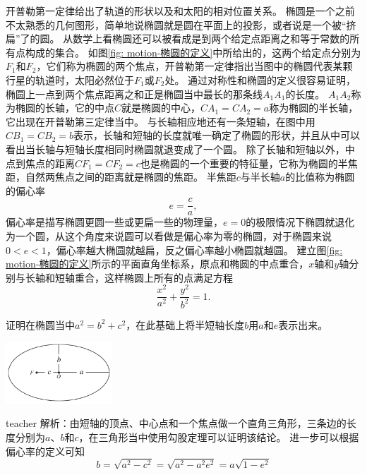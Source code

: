 开普勒第一定律给出了轨道的形状以及和太阳的相对位置关系。
椭圆是一个之前不太熟悉的几何图形，简单地说椭圆就是圆在平面上的投影，或者说是一个被“挤扁”了的圆。
从数学上看椭圆还可以被看成是到两个给定点距离之和等于常数的所有点构成的集合。
如图\ref{fig: motion-椭圆的定义}中所给出的，这两个给定点分别为$F_1$和$F_2$，它们称为椭圆的两个{\heiti 焦点}，开普勒第一定律指出当图中的椭圆代表某颗行星的轨道时，太阳必然位于$F_1$或$F_2$处。
通过对称性和椭圆的定义很容易证明，椭圆上一点到两个焦点距离之和正是椭圆当中最长的那条线$A_1A_1$的长度。
$A_1A_2$称为椭圆的{\heiti 长轴}，它的中点$C$就是椭圆的中心，$CA_1=CA_2=a$称为椭圆的半长轴，它出现在开普勒第三定律当中。
与长轴相应地还有一条短轴，在图中用$CB_1=CB_2=b$表示，长轴和短轴的长度就唯一确定了椭圆的形状，并且从中可以看出当长轴与短轴长度相同时椭圆就退变成了一个圆。
除了长轴和短轴以外，中点到焦点的距离$CF_1=CF_2=c$也是椭圆的一个重要的特征量，它称为椭圆的{\heiti 半焦距}，自然两焦点之间的距离就是椭圆的{\heiti 焦距}。
半焦距$c$与半长轴$a$的比值称为椭圆的偏心率
\begin{equation}
e = \frac{c}{a},
\end{equation}
偏心率是描写椭圆更圆一些或更扁一些的物理量，$e=0$的极限情况下椭圆就退化为一个圆，从这个角度来说圆可以看做是偏心率为零的椭圆，对于椭圆来说$0<e<1$，偏心率越大椭圆就越扁，反之偏心率越小椭圆就越圆。
建立图\ref{fig: motion-椭圆的定义}所示的平面直角坐标系，原点和椭圆的中点重合，$x$轴和$y$轴分别与长轴和短轴重合，这样椭圆上所有的点满足方程
\begin{equation}
\frac{x^2}{a^2}+\frac{y^2}{b^2}=1.
\end{equation}




\begin{example}
证明在椭圆当中$a^2=b^2+c^2$，在此基础上将半短轴长度$b$用$a$和$e$表示出来。
\begin{flushright}
\includegraphics[width = 0.3\textwidth]{images/motion-37.pdf} 
\end{flushright}
\begin{taggedblock}{teacher}
\noindent
解析：由短轴的顶点、中心点和一个焦点做一个直角三角形，三条边的长度分别为$a$、$b$和$c$，在三角形当中使用勾股定理可以证明该结论。
进一步可以根据偏心率的定义可知
\[
b=\sqrt{a^2-c^2}=\sqrt{a^2-a^2e^2} = a\sqrt{1-e^2}
\]
\end{taggedblock}
\end{example}

